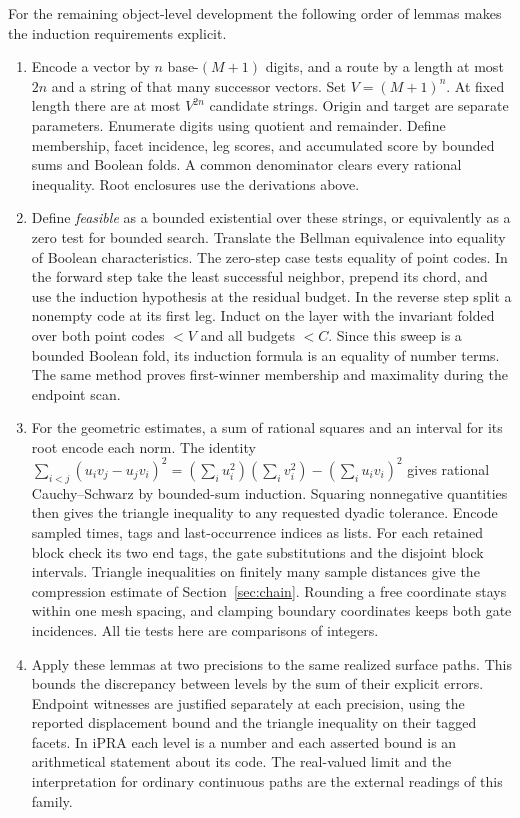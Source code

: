 \documentclass[10pt,letterpaper]{article}
\begin{document}
For the remaining object-level development the following order of
lemmas makes the induction requirements explicit.
\begin{enumerate}
\item Encode a vector by $n$ base-$(M+1)$ digits, and a route by a
length at most $2n$ and a string of that many successor vectors. Set
$V=(M+1)^n$. At fixed length there are at most $V^{2n}$
candidate strings. Origin and target are separate parameters. Enumerate
digits using quotient and remainder. Define membership, facet incidence,
leg scores, and accumulated score by bounded sums and Boolean folds.
A common denominator clears every rational inequality. Root enclosures
use the derivations above.
\item Define \emph{feasible} as a bounded existential over these
strings, or equivalently as a zero test for bounded search. Translate
the Bellman equivalence into equality of Boolean characteristics. The
zero-step case tests equality of point codes. In the forward step
take the least successful neighbor, prepend its chord, and use the
induction hypothesis at the residual budget. In the reverse step
split a nonempty code at its first leg. Induct on the layer with
the invariant folded over both point codes $<V$ and all budgets $<C$.
Since this sweep is a bounded Boolean fold, its induction formula is
an equality of number terms. The same method proves first-winner
membership and maximality during the endpoint scan.
\item For the geometric estimates, a sum of rational squares and
an interval for its root encode each norm. The identity
$\sum_{i<j}(u_i v_j-u_j v_i)^2=
(\sum_i u_i^2)(\sum_i v_i^2)-(\sum_i u_i v_i)^2$ gives rational
Cauchy--Schwarz by bounded-sum induction. Squaring nonnegative
quantities then gives the triangle inequality to any requested
dyadic tolerance. Encode sampled times, tags and last-occurrence
indices as lists. For each retained block check its two end tags,
the gate substitutions and the disjoint block intervals.
Triangle inequalities on finitely many sample distances give the
compression estimate of Section~\ref{sec:chain}. Rounding a free
coordinate stays within one mesh spacing, and clamping boundary
coordinates keeps both gate incidences. All tie tests here are
comparisons of integers.
\item Apply these lemmas at two precisions to the same realized
surface paths. This bounds the discrepancy between levels by the sum
of their explicit errors. Endpoint witnesses are justified separately
at each precision, using the reported displacement bound and the
triangle inequality on their tagged facets. In iPRA each level is a
number and each asserted bound is an arithmetical statement about
its code. The real-valued limit and the interpretation for ordinary
continuous paths are the external readings of this family.
\end{enumerate}
\end{document}
